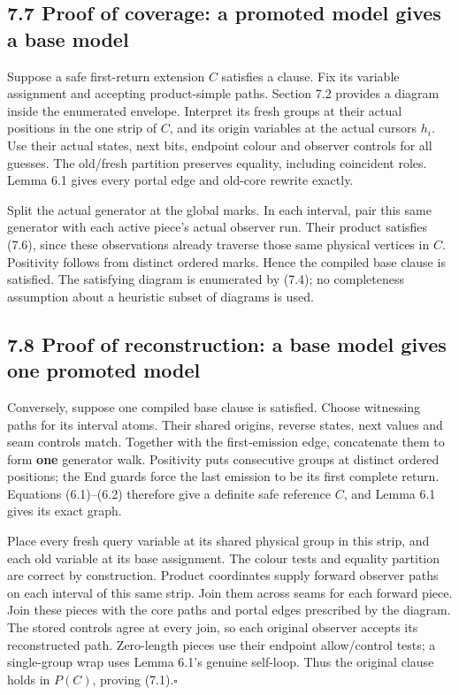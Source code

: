 \documentclass[
  11pt,
  a4paper,
]{article}
\begin{document}
\subsection{7.7 Proof of coverage: a promoted model gives a base
model}\label{proof-of-coverage-a-promoted-model-gives-a-base-model}

Suppose a safe first-return extension \(C\) satisfies a clause. Fix its
variable assignment and accepting product-simple paths. Section 7.2
provides a diagram inside the enumerated envelope. Interpret its fresh
groups at their actual positions in the one strip of \(C\), and its
origin variables at the actual cursors \(h_i\). Use their actual states,
next bits, endpoint colour and observer controls for all guesses. The
old/fresh partition preserves equality, including coincident roles.
Lemma 6.1 gives every portal edge and old-core rewrite exactly.

Split the actual generator at the global marks. In each interval, pair
this same generator with each active piece's actual observer run. Their
product satisfies (7.6), since these observations already traverse those
same physical vertices in \(C\). Positivity follows from distinct
ordered marks. Hence the compiled base clause is satisfied. The
satisfying diagram is enumerated by (7.4); no completeness assumption
about a heuristic subset of diagrams is used.

\subsection{7.8 Proof of reconstruction: a base model gives one promoted
model}\label{proof-of-reconstruction-a-base-model-gives-one-promoted-model}

Conversely, suppose one compiled base clause is satisfied. Choose
witnessing paths for its interval atoms. Their shared origins, reverse
states, next values and seam controls match. Together with the
first-emission edge, concatenate them to form \textbf{one} generator
walk. Positivity puts consecutive groups at distinct ordered positions;
the End guards force the last emission to be its first complete return.
Equations (6.1)--(6.2) therefore give a definite safe reference \(C\),
and Lemma 6.1 gives its exact graph.

Place every fresh query variable at its shared physical group in this
strip, and each old variable at its base assignment. The colour tests
and equality partition are correct by construction. Product coordinates
supply forward observer paths on each interval of this same strip. Join
them across seams for each forward piece. Join these pieces with the
core paths and portal edges prescribed by the diagram. The stored
controls agree at every join, so each original observer accepts its
reconstructed path. Zero-length pieces use their endpoint allow/control
tests; a single-group wrap uses Lemma 6.1's genuine self-loop. Thus the
original clause holds in \(P(C)\), proving
(7.1).\nobreak\hspace{.5em}\(\square\)
\end{document}
